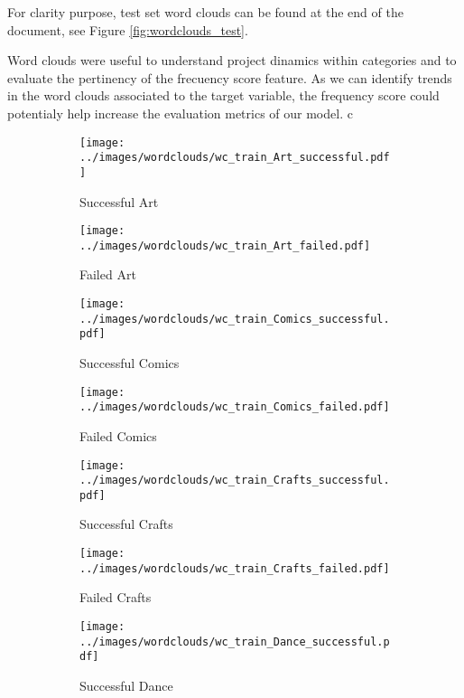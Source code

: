 \documentclass{article}
\begin{document}
{\begin{itemize}
For clarity purpose, test set word clouds can be found at the end of the document, see Figure \ref{fig:wordclouds_test}.

Word clouds were useful to understand project dinamics within categories and to evaluate the pertinency of the frecuency score feature. As we can identify trends in the word clouds associated to the target variable, the frequency score could potentialy help increase the evaluation metrics of our model.
c
\begin{figure}
  \begin{subfigure}[a]{0.2\linewidth}
    \centering\texttt{[image: ../images/wordclouds/wc\_train\_Art\_successful.pdf]}
    \caption{Successful Art}
    \label{fig:Art_s}
  \end{subfigure}
  \begin{subfigure}[a']{0.2\linewidth}
    \centering\texttt{[image: ../images/wordclouds/wc\_train\_Art\_failed.pdf]}
    \caption{Failed Art}
    \label{fig:Art_f}
  \end{subfigure}
  \begin{subfigure}[b]{0.2\linewidth}
    \centering\texttt{[image: ../images/wordclouds/wc\_train\_Comics\_successful.pdf]}
    \caption{Successful Comics}
    \label{fig:Comic_s}
  \end{subfigure} 
  \begin{subfigure}[b']{0.2\linewidth}
    \centering\texttt{[image: ../images/wordclouds/wc\_train\_Comics\_failed.pdf]}
    \caption{Failed Comics}
    \label{fig:Comic_f}
  \end{subfigure}
  \begin{subfigure}[c]{0.2\linewidth}
    \centering\texttt{[image: ../images/wordclouds/wc\_train\_Crafts\_successful.pdf]}
    \caption{Successful Crafts}
    \label{fig:Crafts_s}
  \end{subfigure}
    \begin{subfigure}[c']{0.2\linewidth}
    \centering\texttt{[image: ../images/wordclouds/wc\_train\_Crafts\_failed.pdf]}
    \caption{Failed Crafts}
    \label{fig:Crafts_f}
  \end{subfigure}
    \begin{subfigure}[d]{0.2\linewidth}
    \centering\texttt{[image: ../images/wordclouds/wc\_train\_Dance\_successful.pdf]}
    \caption{Successful Dance}
    \label{fig:Dance_s}
  \end{subfigure}
    \begin{subfigure}[d']{0.2\linewidth}

\end{subfigure}
\end{figure}
\end{itemize}}
\end{document}
